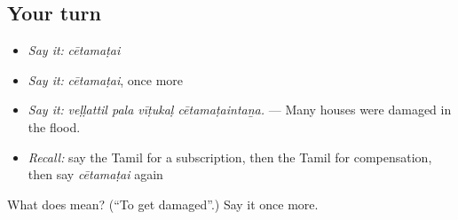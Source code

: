 \subsection*{Your turn}
\begin{itemize}
\raggedright
  \item \emph{Say it:} \emph{cētamaṭai}
  \item \emph{Say it:} \emph{cētamaṭai}, once more
  \item \emph{Say it:} \emph{veḷḷattil pala vīṭukaḷ cētamaṭaintaṉa.} — Many houses were damaged in the flood.
  \item \emph{Recall:} say the Tamil for a subscription, then the Tamil for compensation, then say \emph{cētamaṭai} again
\end{itemize}

\begin{tcolorbox}[breakable,colback=teal!4,colframe=teal!35!black,title={Before you move on}]
What does  mean? (\textquotedblleft{}To get damaged\textquotedblright{}.) Say it once more.
\end{tcolorbox}
